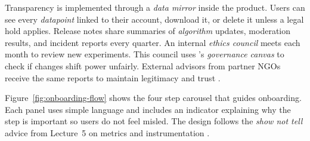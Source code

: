 Transparency is implemented through a \textit{data mirror} inside the product. Users can see every \textit{datapoint} linked to their account, download it, or delete it unless a legal hold applies. Release notes share summaries of \textit{algorithm} updates, moderation results, and incident reports every quarter. An internal \textit{ethics council} meets each month to review new experiments. This council uses \citet{Reillier2017}'s \textit{governance canvas} to check if changes shift power unfairly. External advisors from partner NGOs receive the same reports to maintain legitimacy and trust \citep{Srnicek2017}.

Figure~\ref{fig:onboarding-flow} shows the four step carousel that guides onboarding. Each panel uses simple language and includes an indicator explaining why the step is important so users do not feel misled. The design follows the \textit{show not tell} advice from Lecture~5 on metrics and instrumentation \citep{Lecture05}.

